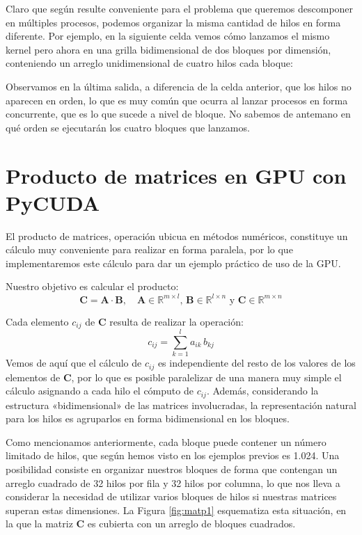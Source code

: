 
Claro que según resulte conveniente para el problema que queremos descomponer en múltiples procesos, podemos organizar la misma cantidad de hilos en forma diferente. Por ejemplo, en la siguiente celda vemos cómo lanzamos el mismo kernel pero ahora en una grilla bidimensional de dos bloques por dimensión, conteniendo un arreglo unidimensional de cuatro hilos cada bloque:


Observamos en la última salida, a diferencia de la celda anterior, que los hilos no aparecen en orden, lo que es muy común que ocurra al lanzar procesos en forma concurrente, que es lo que sucede a nivel de bloque. No sabemos de antemano en qué orden se ejecutarán los cuatro bloques que lanzamos. 



\section{Producto de matrices en GPU con PyCUDA}

El producto de matrices, operación ubicua en métodos numéricos, constituye un cálculo muy conveniente para realizar en forma paralela, por lo que implementaremos este cálculo para dar un ejemplo práctico de uso de la GPU.

Nuestro objetivo es calcular el producto:
\[ \bm{C} = \bm{A} \cdot \bm{B}, \quad \bm{A} \in \mathbb{R}^{m \times l}, \, \bm{B} \in \mathbb{R}^{l \times n} \text{ y } \bm{C} \in \mathbb{R}^{m \times n} \]

Cada elemento $c_{ij}$ de $\bm{C}$ resulta de realizar la operación:
\[ c_{ij} = \sum_{k = 1}^l a_{ik} \, b_{kj} \]
Vemos de aquí que el cálculo de $c_{ij}$ es independiente del resto de los valores de los elementos de $\bm{C}$, por lo que es posible paralelizar de una manera muy simple el cálculo asignando a cada hilo el cómputo de $c_{ij}$. Además, considerando la estructura «bidimensional» de las matrices involucradas, la representación natural para los hilos es agruparlos en forma bidimensional en los bloques.

Como mencionamos anteriormente, cada bloque puede contener un número limitado de hilos, que según hemos visto en los ejemplos previos es 1.024. Una posibilidad consiste en organizar nuestros bloques de forma que contengan un arreglo cuadrado de 32 hilos por fila y 32 hilos por columna, lo que nos lleva a considerar la necesidad de utilizar varios bloques de hilos si nuestras matrices superan estas dimensiones. La Figura \ref{fig:matp1} esquematiza esta situación, en la que la matriz $\bm{C}$ es cubierta con un arreglo de bloques cuadrados.


